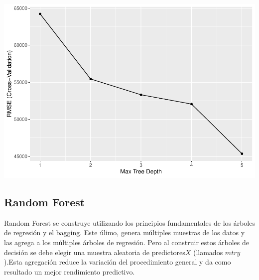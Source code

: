 \documentclass[
]{article}
\newenvironment{Shaded}{\begin{snugshade}}{\end{snugshade}}
\newcommand{\AttributeTok}[1]{\textcolor[rgb]{0.77,0.63,0.00}{#1}}
\newcommand{\FunctionTok}[1]{\textcolor[rgb]{0.00,0.00,0.00}{#1}}
\newcommand{\NormalTok}[1]{#1}
\newcommand{\OtherTok}[1]{\textcolor[rgb]{0.56,0.35,0.01}{#1}}
\newcommand{\SpecialCharTok}[1]{\textcolor[rgb]{0.00,0.00,0.00}{#1}}
\begin{document}
\includegraphics{LAB02_files/figure-latex/unnamed-chunk-6-1.pdf}

\begin{Shaded}
\end{Shaded}

\hypertarget{random-forest}{%
\subsection{Random Forest}\label{random-forest}}

Random Forest se construye utilizando los principios fundamentales de
los árboles de regresión y el bagging. Este úlimo, genera múltiples
muestras de los datos y las agrega a los múltiples árboles de regresión.
Pero al construir estos árboles de decisión se debe elegir una muestra
aleatoria de predictores\(X\) (llamados \(mtry\)).Esta agregación reduce
la variación del procedimiento general y da como resultado un mejor
rendimiento predictivo.
\end{document}
